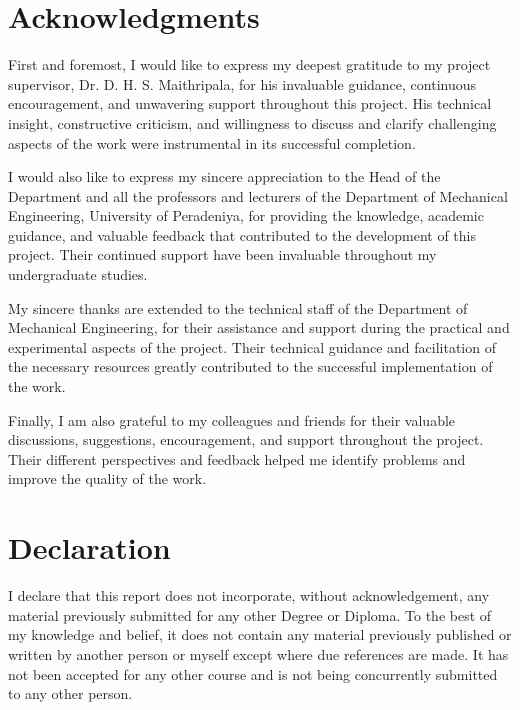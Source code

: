 \documentclass[12pt, a4paper]{article}
\begin{document}
	\section*{Acknowledgments}
	
	First and foremost, I would like to express my deepest gratitude to my project supervisor, Dr. D. H. S. Maithripala, for his invaluable guidance, continuous encouragement, and unwavering support throughout this project. His technical insight, constructive criticism, and willingness to discuss and clarify challenging aspects of the work were instrumental in its successful completion.
	
	I would also like to express my sincere appreciation to the Head of the Department and all the professors and lecturers of the Department of Mechanical Engineering, University of Peradeniya, for providing the knowledge, academic guidance, and valuable feedback that contributed to the development of this project. Their continued support have been invaluable throughout my undergraduate studies. 
	
	My sincere thanks are extended to the technical staff of the Department of Mechanical Engineering,  for their assistance and support during the practical and experimental aspects of the project. Their technical guidance and facilitation of the necessary resources greatly contributed to the successful implementation of the work.
	
	Finally,  I am also grateful to my colleagues and friends for their valuable discussions, suggestions, encouragement, and support throughout the project. Their different perspectives and feedback helped me identify problems and improve the quality of the work.
	

	
	\newpage
	
	\newpage
	\section*{Declaration}
	
	I declare that this report does not incorporate, without acknowledgement, any material previously submitted for any other Degree or Diploma. To the best of my knowledge and belief, it does not contain any material previously published or written by another person or myself except where due references are made. It has not been accepted for any other course and is not being concurrently submitted to any other person.
	
\end{document}
